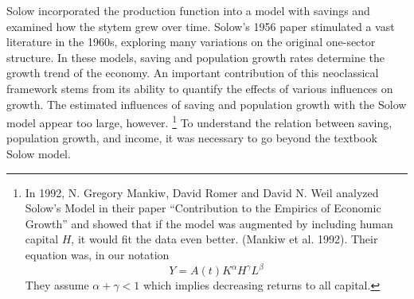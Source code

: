 

Solow incorporated the production function into a model with savings and examined how the stytem grew over time. Solow's 1956 paper stimulated a vast literature in the 1960s, exploring many variations on the original one-sector structure. %
In these models, saving and population growth rates determine the growth trend of the economy. An important  contribution of this neoclassical framework stems from its ability to quantify the effects of various influences on growth. The estimated influences of saving and population growth with the Solow model appear too large, however.%
\footnote{In 1992, N. Gregory Mankiw, David Romer %
and David N. Weil analyzed Solow's Model in their paper ``Contribution to the Empirics of Economic Growth'' and  showed that %
if the model was augmented by including human capital $H$, it would fit the data even better.   (Mankiw et al. 1992). Their equation was, in our notation   
\begin{equation*}
Y=A(t)K^\alpha H^\gamma L^\beta 
\end{equation*}
 They assume $\alpha+\gamma<1$ which implies decreasing returns to all capital.} 
To understand the relation between saving, population growth, and income, it was necessary to go beyond the textbook Solow model.%

